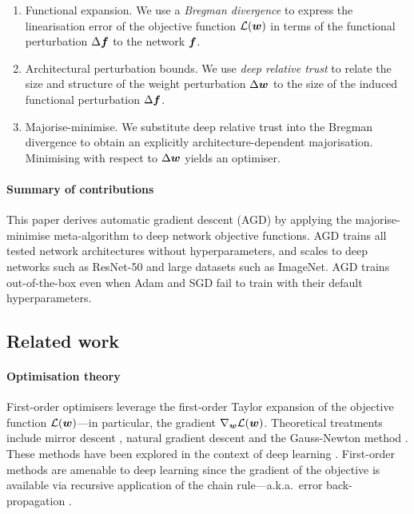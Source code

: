 \begin{enumerate}[label=Step \arabic*:, leftmargin=*, font=\sffamily]
    \item \textsf{Functional expansion}. We use a \textit{Bregman divergence} to express the linearisation error of the objective function $\mathcal{L}({\bm{w}})$ in terms of the functional perturbation $\Delta {\bm{f}}$ to the network ${\bm{f}}$.
    \item \textsf{Architectural perturbation bounds.} We use \textit{deep relative trust} to relate the size and structure of the weight perturbation $\Delta {\bm{w}}$ to the size of the induced functional perturbation $\Delta {\bm{f}}$.
    \item \textsf{Majorise-minimise.} We substitute deep relative trust into the Bregman divergence to obtain an explicitly architecture-dependent majorisation. Minimising with respect to $\Delta {\bm{w}}$ yields an optimiser.
\end{enumerate}

\paragraph{Summary of contributions} This paper derives automatic gradient descent (AGD) by applying the majorise-minimise meta-algorithm to deep network objective functions. AGD trains all tested network architectures without hyperparameters, and scales to deep networks such as ResNet-50 and large datasets such as ImageNet. AGD trains out-of-the-box even when Adam and SGD fail to train with their default hyperparameters.



\subsection{Related work}

\paragraph{Optimisation theory} First-order optimisers leverage the first-order Taylor expansion of the objective function $\mathcal{L}({\bm{w}})$---in particular, the gradient $\nabla_{\bm{w}}\mathcal{L}({\bm{w}})$. Theoretical treatments include mirror descent \citep{nemirovsky_yudin_1983}, 
natural gradient descent \citep{amari} and the Gauss-Newton method \citep{gauss-newton}. These methods have been explored in the context of deep learning \citep{revisiting-ngd,azizan2018stochastic,sun2022mirror}. First-order methods are amenable to deep learning since the gradient of the objective is available via recursive application of the chain rule---a.k.a.\ error back-propagation \citep{Rumelhart1986LearningRB}.


